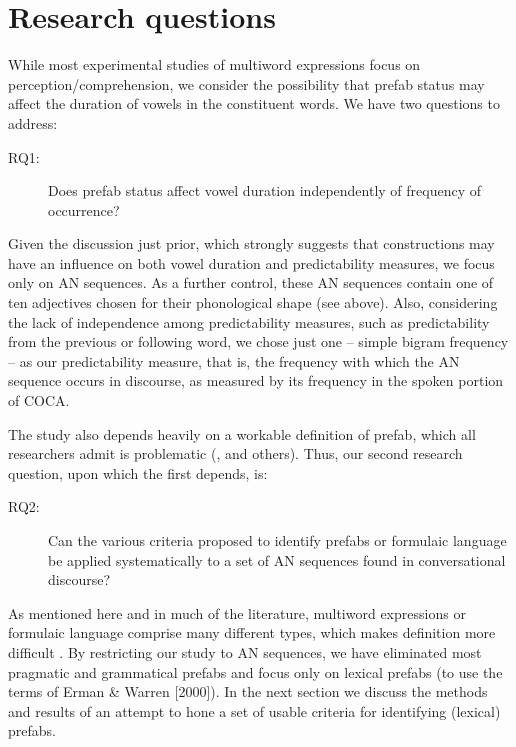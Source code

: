 \documentclass[output=paper]{langscibook}
\begin{document}
\largerpage
\section{Research questions}\label{sec:bybee:2}

While most experimental studies of multiword expressions focus on perception/comprehension, we consider the possibility that prefab status may affect the duration of vowels in the constituent words. We have two questions to address:  

\begin{description}
\item[RQ1:] Does prefab status affect vowel duration independently of frequency of occurrence?
\end{description}

Given the discussion just prior, which strongly suggests that constructions may have an influence on both vowel duration and predictability measures, we focus only on AN sequences. As a further control, these AN sequences contain one of ten adjectives chosen for their phonological shape (see above). Also, considering the lack of independence among predictability measures, such as predictability from the previous or following word, we chose just one -- simple bigram frequency -- as our predictability measure, that is, the frequency with which the AN sequence occurs in discourse, as measured by its frequency in the spoken portion of COCA.

The study also depends heavily on a workable definition of prefab, which all researchers admit is problematic (\citealt{ErmanWarren2000,Wray2002}, and others). Thus, our second research question, upon which the first depends, is:

\begin{description}
\item[RQ2:] Can the various criteria proposed to identify prefabs or formulaic language be applied systematically to a set of AN sequences found in conversational discourse?
\end{description}

As mentioned here and in much of the literature, multiword expressions or formulaic language comprise many different types, which makes definition more difficult \citep{Wray2002}. By restricting our study to AN sequences, we have eliminated most pragmatic and grammatical prefabs and focus only on lexical prefabs (to use the terms of Erman \& Warren [2000]). In the next section we discuss the methods and results of an attempt to hone a set of usable criteria for identifying (lexical) prefabs. 
\end{document}
